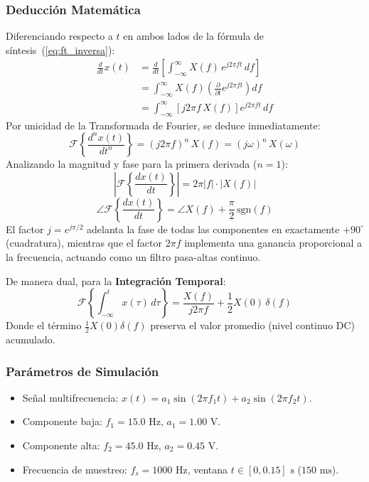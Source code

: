 \documentclass[11pt,a4paper]{article}
\begin{document}
\subsubsection{Deducci\'on Matem\'atica}
Diferenciando respecto a $t$ en ambos lados de la f\'ormula de s\'intesis~(\ref{eq:ft_inversa}):
\begin{align}
  \frac{d}{dt} x(t) &= \frac{d}{dt} \left[ \int_{-\infty}^{\infty} X(f) \, e^{j 2\pi f t} \, df \right] \nonumber \\
  &= \int_{-\infty}^{\infty} X(f) \left( \frac{\partial}{\partial t} e^{j 2\pi f t} \right) df \nonumber \\
  &= \int_{-\infty}^{\infty} \left[ j 2\pi f \, X(f) \right] e^{j 2\pi f t} \, df
\end{align}
Por unicidad de la Transformada de Fourier, se deduce inmediatamente:
\begin{equation}
  \mathcal{F}\left\{ \frac{d^n x(t)}{dt^n} \right\} = (j 2\pi f)^n \, X(f) = (j\omega)^n \, X(\omega)
  \label{eq:differentiation}
\end{equation}
Analizando la magnitud y fase para la primera derivada ($n = 1$):
\begin{equation}
  \left| \mathcal{F}\left\{ \frac{dx(t)}{dt} \right\} \right| = 2\pi |f| \cdot |X(f)|
\end{equation}
\begin{equation}
  \angle \mathcal{F}\left\{ \frac{dx(t)}{dt} \right\} = \angle X(f) + \frac{\pi}{2} \, \text{sgn}(f)
\end{equation}
El factor $j = e^{j\pi/2}$ adelanta la fase de todas las componentes en exactamente $+90^\circ$ (cuadratura), mientras que el factor $2\pi f$ implementa una ganancia proporcional a la frecuencia, actuando como un filtro pasa-altas continuo.

De manera dual, para la \textbf{Integraci\'on Temporal}:
\begin{equation}
  \mathcal{F}\left\{ \int_{-\infty}^t x(\tau) \, d\tau \right\} = \frac{X(f)}{j 2\pi f} + \frac{1}{2} X(0) \, \delta(f)
  \label{eq:integration}
\end{equation}
Donde el t\'ermino $\frac{1}{2}X(0)\delta(f)$ preserva el valor promedio (nivel continuo DC) acumulado.

\subsubsection{Par\'ametros de Simulaci\'on}
\begin{itemize}[noitemsep]
  \item Se\~nal multifrecuencia: $x(t) = a_1 \sin(2\pi f_1 t) + a_2 \sin(2\pi f_2 t)$.
  \item Componente baja: $f_1 = 15.0\text{ Hz}$, $a_1 = 1.00\text{ V}$.
  \item Componente alta: $f_2 = 45.0\text{ Hz}$, $a_2 = 0.45\text{ V}$.
  \item Frecuencia de muestreo: $f_s = 1000\text{ Hz}$, ventana $t \in [0, 0.15]\text{ s}$ ($150\text{ ms}$).
\end{itemize}
\end{document}
